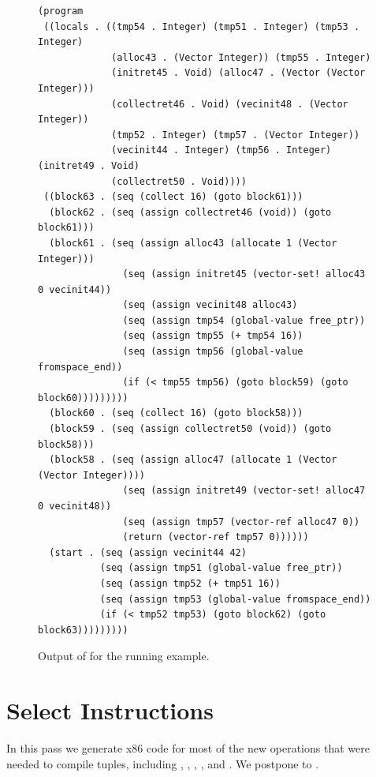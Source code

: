 \documentclass[11pt]{book}
\begin{document}
\begin{figure}[tbp]
\begin{lstlisting}
(program
 ((locals . ((tmp54 . Integer) (tmp51 . Integer) (tmp53 . Integer)
             (alloc43 . (Vector Integer)) (tmp55 . Integer)
             (initret45 . Void) (alloc47 . (Vector (Vector Integer)))
             (collectret46 . Void) (vecinit48 . (Vector Integer))
             (tmp52 . Integer) (tmp57 . (Vector Integer))
             (vecinit44 . Integer) (tmp56 . Integer) (initret49 . Void)
             (collectret50 . Void))))
 ((block63 . (seq (collect 16) (goto block61)))
  (block62 . (seq (assign collectret46 (void)) (goto block61)))
  (block61 . (seq (assign alloc43 (allocate 1 (Vector Integer)))
               (seq (assign initret45 (vector-set! alloc43 0 vecinit44))
               (seq (assign vecinit48 alloc43)
               (seq (assign tmp54 (global-value free_ptr))
               (seq (assign tmp55 (+ tmp54 16))
               (seq (assign tmp56 (global-value fromspace_end))
               (if (< tmp55 tmp56) (goto block59) (goto block60)))))))))
  (block60 . (seq (collect 16) (goto block58)))
  (block59 . (seq (assign collectret50 (void)) (goto block58)))
  (block58 . (seq (assign alloc47 (allocate 1 (Vector (Vector Integer))))
               (seq (assign initret49 (vector-set! alloc47 0 vecinit48))
               (seq (assign tmp57 (vector-ref alloc47 0))
               (return (vector-ref tmp57 0))))))
  (start . (seq (assign vecinit44 42)
           (seq (assign tmp51 (global-value free_ptr))
           (seq (assign tmp52 (+ tmp51 16))
           (seq (assign tmp53 (global-value fromspace_end))
           (if (< tmp52 tmp53) (goto block62) (goto block63)))))))))
\end{lstlisting}
\caption{Output of  for the running example.}
\label{fig:uncover-locals-r3}
\end{figure}

\clearpage

\section{Select Instructions}
\label{sec:select-instructions-gc}


In this pass we generate x86 code for most of the new operations that
were needed to compile tuples, including ,
, , , and
. We postpone  to .
\end{document}
